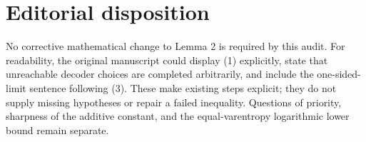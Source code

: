 \documentclass[11pt,a4paper]{article}
\begin{document}
\section{Editorial disposition}
No corrective mathematical change to Lemma 2 is required by this audit.
For readability, the original manuscript could display (1) explicitly,
state that unreachable decoder choices are completed arbitrarily, and
include the one-sided-limit sentence following (3). These make existing
steps explicit; they do not supply missing hypotheses or repair a failed
inequality. Questions of priority, sharpness of the additive constant,
and the equal-varentropy logarithmic lower bound remain separate.
\end{document}
